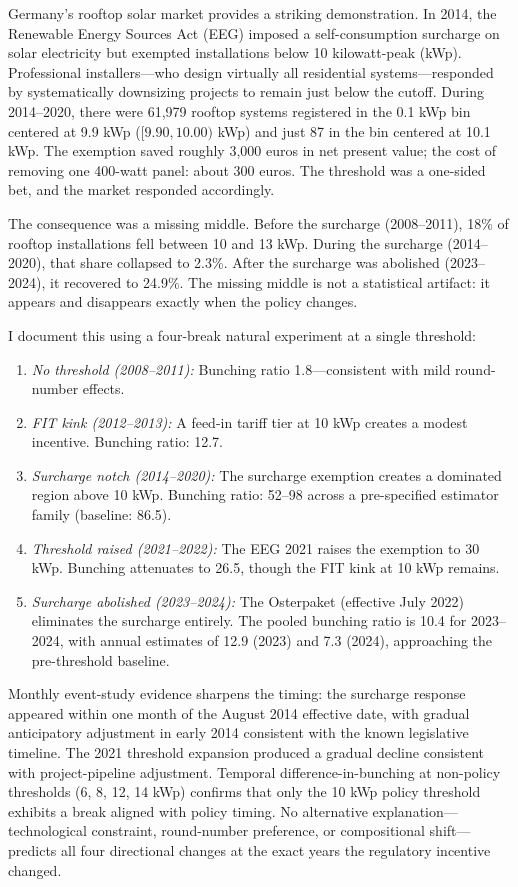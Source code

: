 \documentclass[12pt]{article}
\begin{document}
Germany's rooftop solar market provides a striking demonstration. In 2014, the Renewable Energy Sources Act (EEG) imposed a self-consumption surcharge on solar electricity but exempted installations below 10 kilowatt-peak (kWp). Professional installers---who design virtually all residential systems---responded by systematically downsizing projects to remain just below the cutoff. During 2014--2020, there were 61,979 rooftop systems registered in the 0.1 kWp bin centered at 9.9 kWp ($[9.90, 10.00)$ kWp) and just 87 in the bin centered at 10.1 kWp. The exemption saved roughly 3,000 euros in net present value; the cost of removing one 400-watt panel: about 300 euros. The threshold was a one-sided bet, and the market responded accordingly.

The consequence was a missing middle. Before the surcharge (2008--2011), 18\% of rooftop installations fell between 10 and 13 kWp. During the surcharge (2014--2020), that share collapsed to 2.3\%. After the surcharge was abolished (2023--2024), it recovered to 24.9\%. The missing middle is not a statistical artifact: it appears and disappears exactly when the policy changes.

I document this using a four-break natural experiment at a single threshold:
\begin{enumerate}
  \item \textit{No threshold (2008--2011):} Bunching ratio 1.8---consistent with mild round-number effects.
  \item \textit{FIT kink (2012--2013):} A feed-in tariff tier at 10 kWp creates a modest incentive. Bunching ratio: 12.7.
  \item \textit{Surcharge notch (2014--2020):} The surcharge exemption creates a dominated region above 10 kWp. Bunching ratio: 52--98 across a pre-specified estimator family (baseline: 86.5).
  \item \textit{Threshold raised (2021--2022):} The EEG 2021 raises the exemption to 30 kWp. Bunching attenuates to 26.5, though the FIT kink at 10 kWp remains.
  \item \textit{Surcharge abolished (2023--2024):} The Osterpaket (effective July 2022) eliminates the surcharge entirely. The pooled bunching ratio is 10.4 for 2023--2024, with annual estimates of 12.9 (2023) and 7.3 (2024), approaching the pre-threshold baseline.
\end{enumerate}

Monthly event-study evidence sharpens the timing: the surcharge response appeared within one month of the August 2014 effective date, with gradual anticipatory adjustment in early 2014 consistent with the known legislative timeline. The 2021 threshold expansion produced a gradual decline consistent with project-pipeline adjustment. Temporal difference-in-bunching at non-policy thresholds (6, 8, 12, 14 kWp) confirms that only the 10 kWp policy threshold exhibits a break aligned with policy timing. No alternative explanation---technological constraint, round-number preference, or compositional shift---predicts all four directional changes at the exact years the regulatory incentive changed.
\end{document}
